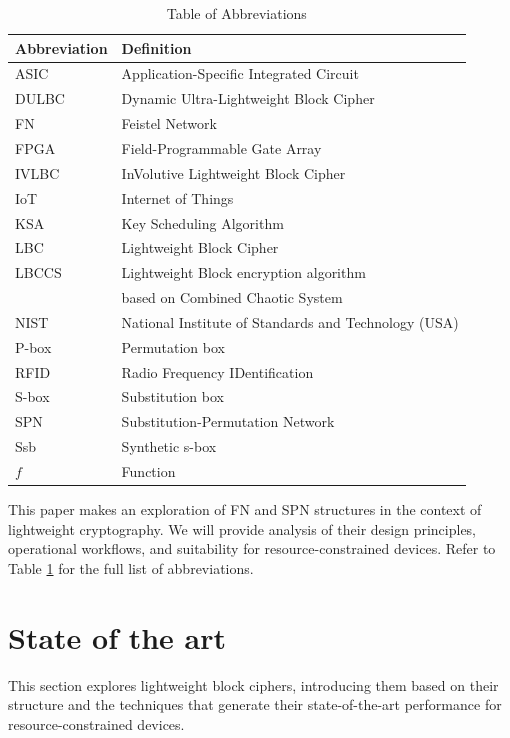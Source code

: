 \documentclass[conference]{IEEEtran}
\begin{document}
\begin{table}[ht]
    \centering
    \caption{Table of Abbreviations}
    \begin{tabular}{ll}
        \toprule
        \textbf{Abbreviation} & \textbf{Definition} \\
        \midrule
        ASIC & Application-Specific Integrated Circuit \\
        DULBC & Dynamic Ultra-Lightweight Block Cipher \\
        FN & Feistel Network \\
        FPGA & Field-Programmable Gate Array \\
        IVLBC & InVolutive Lightweight Block Cipher \\
        IoT & Internet of Things \\
        KSA & Key Scheduling Algorithm \\
        LBC & Lightweight Block Cipher \\
        LBCCS & Lightweight Block encryption algorithm \\
        & based on Combined Chaotic System \\
        NIST & National Institute of Standards and Technology (USA) \\
        P-box & Permutation box \\
        RFID & Radio Frequency IDentification \\
        S-box & Substitution box \\
        SPN & Substitution-Permutation Network \\
        Ssb & Synthetic s-box \\
        $f$ & Function \\
        \bottomrule
    \end{tabular}
    \label{table:abbreviations}
\end{table}

This paper makes an exploration of FN and SPN structures in the context of lightweight cryptography. We will provide analysis of their design principles, operational workflows, and suitability for resource-constrained devices. Refer to Table \ref{table:abbreviations} for the full list of abbreviations.

\section{State of the art}

This section explores lightweight block ciphers, introducing them based on their structure and the techniques that generate their state-of-the-art performance for resource-constrained devices.
\end{document}
